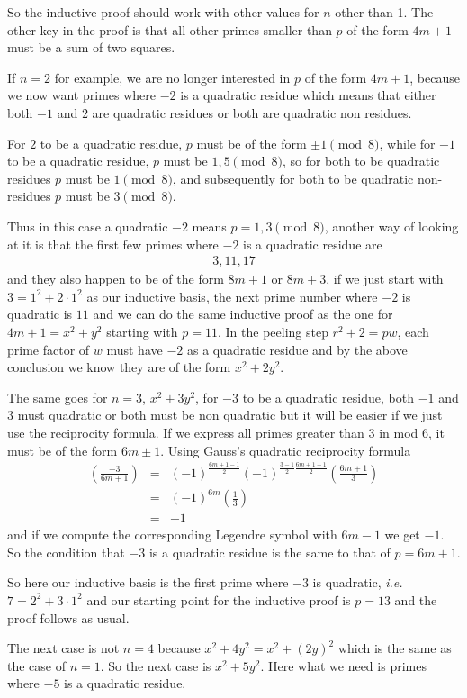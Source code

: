 \documentclass[aps,preprint,preprintnumbers,nofootinbib,showpacs,prd]{revtex4-1}
\newcommand{\ie}{{\it i.e.} }
\newcommand{\nbea}{\begin{eqnarray*}}
\newcommand{\neea}{\end{eqnarray*}}
\begin{document}
So the inductive proof should work with other values for $n$ other than 1. The other key in the proof is that all other primes smaller than $p$ of the form $4m+1$ must be a sum of two squares.

If $n = 2$ for example, we are no longer interested in $p$ of the form $4m+1$, because we now want primes where $-2$ is a quadratic residue which means that either both $-1$ and $2$ are quadratic residues or both are quadratic non residues.

For $2$ to be a quadratic residue, $p$ must be of the form $\pm1 \pmod{8}$, while for $-1$ to be a quadratic residue, $p$ must be $1,5\pmod{8}$, so for both to be quadratic residues $p$ must be $1 \pmod{8}$, and subsequently for both to be quadratic non-residues $p$ must be $3 \pmod{8}$.

Thus in this case a quadratic $-2$ means $p = 1,3 \pmod{8}$, another way of looking at it is that the first few primes where $-2$ is a quadratic residue are
%
\nbea
3,11,17
\neea
%
and they also happen to be of the form $8m+1$ or $8m+3$, if we just start with $3 = 1^2 + 2\cdot1^2$ as our inductive basis, the next prime number where $-2$ is quadratic is $11$ and we can do the same inductive proof as the one for $4m+1 = x^2 + y^2$ starting with $p=11$. In the peeling step $r^2 + 2 = pw$, each prime factor of $w$ must have $-2$ as a quadratic residue and by the above conclusion we know they are of the form $x^2 + 2y^2$.

The same goes for $n=3$, $x^2 + 3y^2$, for $-3$ to be a quadratic residue, both $-1$ and $3$ must quadratic or both must be non quadratic but it will be easier if we just use the reciprocity formula. If we express all primes greater than 3 in mod $6$, it must be of the form $6m \pm 1$. Using Gauss's quadratic reciprocity formula
%
\nbea
\left(\frac{-3}{6m+1}\right) & = & (-1)^{\frac{6m+1 - 1}{2}} (-1)^{\frac{3-1}{2}\frac{6m+1 - 1}{2}}\left(\frac{6m+1}{3}\right) \\
& = & (-1)^{6m}\left(\frac{1}{3}\right) \\
& = & +1
\neea
%
and if we compute the corresponding Legendre symbol with $6m-1$ we get $-1$. So the condition that $-3$ is a quadratic residue is the same to that of $p = 6m+1$.

So here our inductive basis is the first prime where $-3$ is quadratic, \ie $7 = 2^2 + 3\cdot1^2$ and our starting point for the inductive proof is $p = 13$ and the proof follows as usual.

The next case is not $n=4$ because $x^2 + 4y^2 = x^2 + (2y)^2$ which is the same as the case of $n=1$. So the next case is $x^2 + 5y^2$. Here what we need is primes where $-5$ is a quadratic residue.
\end{document}
